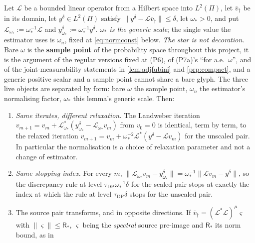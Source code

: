 \begin{lemma}\label{lem:scaleinv}
Let $\mathcal L$ be a bounded linear operator from a Hilbert space into $L^{2}(\Pi)$, let
$\bar v_\dagger$ be in its domain, let $y^\delta\in L^{2}(\Pi)$ satisfy
$\|y^\delta-\mathcal L\bar v_\dagger\|\le\delta$, let $\omega_\ast>0$, and put
$\mathcal L_{\omega_\ast}:=\omega_\ast^{-1}\mathcal L$ and
$y^\delta_{\omega_\ast}:=\omega_\ast^{-1}y^\delta$.
\emph{$\omega_\ast$ is the generic scale}; the single value the estimator uses is $\omega_n$, fixed
at \eqref{eq:normconst} below. \emph{The star is not decoration.} Bare $\omega$ is the \textbf{sample
point} of the probability space throughout this project, it is the argument of the regular versions
fixed at (P6), of (P7a)'s ``for a.e.\ $\omega$'', and of the joint-measurability statements in
\cref{lem:adjfubini} and \cref{prp:compact}, and a generic positive scalar and a sample point cannot
share a bare glyph. The three
live objects are separated by form: bare $\omega$ the sample point, $\omega_n$ the estimator's
normalising factor, $\omega_\ast$ this lemma's generic scale. Then:
\begin{enumerate}
\item[(i)] \emph{Same iterates, different relaxation.} The Landweber iteration
$v_{m+1}=v_m+\mathcal L^{\ast}_{\omega_\ast}(y^\delta_{\omega_\ast}-\mathcal L_{\omega_\ast} v_m)$ from
$v_0=0$ is identical, term by term, to the relaxed iteration
$v_{m+1}=v_m+\omega_\ast^{-2}\mathcal L^{\ast}(y^\delta-\mathcal Lv_m)$ for the unscaled pair. In
particular the normalisation is a choice of relaxation parameter and not a change of estimator.
\item[(ii)] \emph{Same stopping index.} For every $m$,
$\|\mathcal L_{\omega_\ast} v_m-y^\delta_{\omega_\ast}\|=\omega_\ast^{-1}\|\mathcal Lv_m-y^\delta\|$, so
the discrepancy rule at level $\tau_{\mathrm{DP}}\omega_\ast^{-1}\delta$ for the scaled pair stops at
exactly the index at which the rule at level $\tau_{\mathrm{DP}}\delta$ stops for the unscaled pair.
\item[(iii)] The source pair transforms, and in opposite directions. If
$\bar v_\dagger=(\mathcal L^{\ast}\mathcal L)^{\mu}\varsigma$ with $\|\varsigma\|\le\mathsf R_\ast$, 
$\varsigma$ being the \emph{spectral} source pre-image and $\mathsf R_\ast$ its norm bound, as in

\end{enumerate}
\end{lemma}
